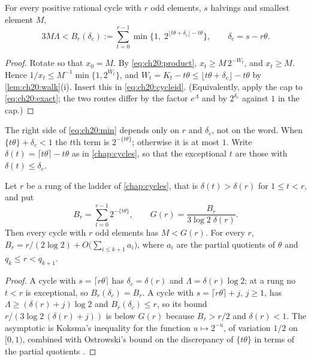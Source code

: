 \begin{theorem}\label{thm:ch20:min}
For every positive rational cycle with $r$ odd elements, $s$ halvings and smallest element $M$,
\begin{equation}\label{eq:ch20:min}
3M\Lambda<B_r(\delta_c):=\sum_{t=0}^{r-1}\min\bigl\{1,\;2^{\lfloor t\theta+\delta_c\rfloor-t\theta}\bigr\},\qquad\delta_c=s-r\theta .
\end{equation}
\end{theorem}

\begin{proof}
Rotate so that $x_0=M$. By \eqref{eq:ch20:product}, $x_t\ge M\,2^{-W_t}$, and $x_t\ge M$. Hence $1/x_t\le M^{-1}\min\{1,2^{W_t}\}$, and $W_t=K_t-t\theta\le\lfloor t\theta+\delta_c\rfloor-t\theta$ by \cref{lem:ch20:walk}(i). Insert this in \eqref{eq:ch20:cycleid}. (Equivalently, apply the cap to \eqref{eq:ch20:exact}; the two routes differ by the factor $e^{\Lambda}$ and by $2^{\delta_c}$ against $1$ in the cap.)
\end{proof}

The right side of \eqref{eq:ch20:min} depends only on $r$ and $\delta_c$, not on the word. When $\{t\theta\}+\delta_c<1$ the $t$th term is $2^{-\{t\theta\}}$; otherwise it is at most $1$. Write $\delta(t)=\lceil t\theta\rceil-t\theta$ as in \cref{chap:cycles}, so that the exceptional $t$ are those with $\delta(t)\le\delta_c$.

\begin{corollary}\label{cor:ch20:ladder}
Let $r$ be a rung of the ladder of \cref{chap:cycles}, that is $\delta(t)>\delta(r)$ for $1\le t<r$, and put
\[
B_r=\sum_{t=0}^{r-1}2^{-\{t\theta\}},\qquad G(r)=\frac{B_r}{3\log 2\;\delta(r)} .
\]
Then every cycle with $r$ odd elements has $M<G(r)$. For every $r$, $B_r=r/(2\log 2)+O\bigl(\sum_{i\le k+1}a_i\bigr)$, where $a_i$ are the partial quotients of $\theta$ and $q_k\le r<q_{k+1}$.
\end{corollary}

\begin{proof}
A cycle with $s=\lceil r\theta\rceil$ has $\delta_c=\delta(r)$ and $\Lambda=\delta(r)\log 2$; at a rung no $t<r$ is exceptional, so $B_r(\delta_c)=B_r$. A cycle with $s=\lceil r\theta\rceil+j$, $j\ge1$, has $\Lambda\ge(\delta(r)+j)\log2$ and $B_r(\delta_c)\le r$, so its bound $r/(3\log2\,(\delta(r)+j))$ is below $G(r)$ because $B_r>r/2$ and $\delta(r)<1$. The asymptotic is Koksma's inequality for the function $u\mapsto 2^{-u}$, of variation $1/2$ on $[0,1)$, combined with Ostrowski's bound on the discrepancy of $\{t\theta\}$ in terms of the partial quotients \cite[Chapter~2]{kuipers1974}.
\end{proof}

